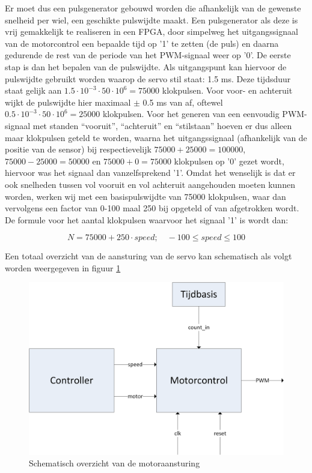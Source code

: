\documentclass{report}
\begin{document}
Er moet dus een pulsgenerator gebouwd worden die afhankelijk van de gewenste snelheid per wiel, een geschikte pulswijdte maakt.
Een pulsgenerator als deze is vrij gemakkelijk te realiseren in een FPGA, door simpelweg het uitgangssignaal van de motorcontrol een bepaalde tijd op '1' te zetten (de puls) en daarna gedurende de rest van de periode van het PWM-signaal weer op '0'.
De eerste stap is dan het bepalen van de pulswijdte.
Als uitgangspunt kan hiervoor de pulswijdte gebruikt worden waarop de servo stil staat: 1.5 ms.
Deze tijdsduur staat gelijk aan $1.5 \cdot 10^{-3} \cdot 50 \cdot 10^{6} = 75000$ klokpulsen.
Voor voor- en achteruit wijkt de pulswijdte hier maximaal $\pm$ 0.5 ms van af, oftewel $0.5 \cdot 10^{-3} \cdot 50 \cdot 10^{6} = 25000$ klokpulsen.
Voor het generen van een eenvoudig PWM-signaal met standen ``vooruit'', ``achteruit'' en ``stilstaan'' hoeven er dus alleen maar klokpulsen geteld te worden, waarna het uitgangssignaal (afhankelijk van de positie van de sensor) bij respectievelijk $75000 + 25000 = 100000$, $75000 - 25000 = 50000$ en $75000 + 0 = 75000$ klokpulsen op '0' gezet wordt, hiervoor was het signaal dan vanzelfsprekend '1'.
Omdat het wenselijk is dat er ook snelheden tussen vol vooruit en vol achteruit aangehouden moeten kunnen worden, werken wij met een basispulswijdte van 75000 klokpulsen, waar dan vervolgens een factor van 0-100 maal 250 bij opgeteld of van afgetrokken wordt.
De formule voor het aantal klokpulsen waarvoor het signaal '1' is wordt dan:

\begin{equation}
	\label{eq:pulsewidth}
	N = 75000 + 250 \cdot speed;\quad -100 \leq speed \leq 100
\end{equation}

Een totaal overzicht van de aansturing van de servo kan schematisch als volgt worden weergegeven in figuur \ref{fig:motorcontrol}

\begin{figure}[H]
	\includegraphics[width=\textwidth]{resource/motor-control}
	\caption{Schematisch overzicht van de motoraansturing}
	\label{fig:motorcontrol}
\end{figure}
\end{document}
